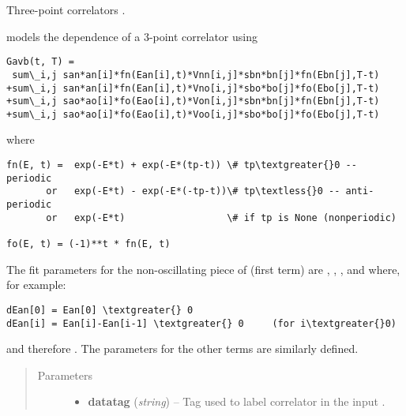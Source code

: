\documentclass[letterpaper,10pt,english]{sphinxmanual}
\begin{document}
\begin{fulllineitems}
\label{corrfitter:corrfitter.Corr3}
Three-point correlators .

{\hyperref[corrfitter:corrfitter.Corr3]{}} models the  dependence of a 3-point correlator
 using

\begin{Verbatim}[commandchars=\\\{\}]
Gavb(t, T) = 
 sum\_i,j san*an[i]*fn(Ean[i],t)*Vnn[i,j]*sbn*bn[j]*fn(Ebn[j],T-t)
+sum\_i,j san*an[i]*fn(Ean[i],t)*Vno[i,j]*sbo*bo[j]*fo(Ebo[j],T-t)
+sum\_i,j sao*ao[i]*fo(Eao[i],t)*Von[i,j]*sbn*bn[j]*fn(Ebn[j],T-t)
+sum\_i,j sao*ao[i]*fo(Eao[i],t)*Voo[i,j]*sbo*bo[j]*fo(Ebo[j],T-t)
\end{Verbatim}

where

\begin{Verbatim}[commandchars=\\\{\}]
fn(E, t) =  exp(-E*t) + exp(-E*(tp-t)) \# tp\textgreater{}0 -- periodic
       or   exp(-E*t) - exp(-E*(-tp-t))\# tp\textless{}0 -- anti-periodic
       or   exp(-E*t)                  \# if tp is None (nonperiodic)

fo(E, t) = (-1)**t * fn(E, t)
\end{Verbatim}

The fit parameters for the non-oscillating piece of  (first term)
are , , ,  and  where,
for example:

\begin{Verbatim}[commandchars=\\\{\}]
dEan[0] = Ean[0] \textgreater{} 0
dEan[i] = Ean[i]-Ean[i-1] \textgreater{} 0     (for i\textgreater{}0)
\end{Verbatim}

and therefore . The parameters for the
other terms are similarly defined.
\begin{quote}\begin{description}
\item[{Parameters}] \leavevmode\begin{itemize}
\item {} 
\textbf{datatag} (\emph{string}) -- Tag used to label correlator in the input .


\end{itemize}
\end{description}
\end{quote}
\end{fulllineitems}
\end{document}
